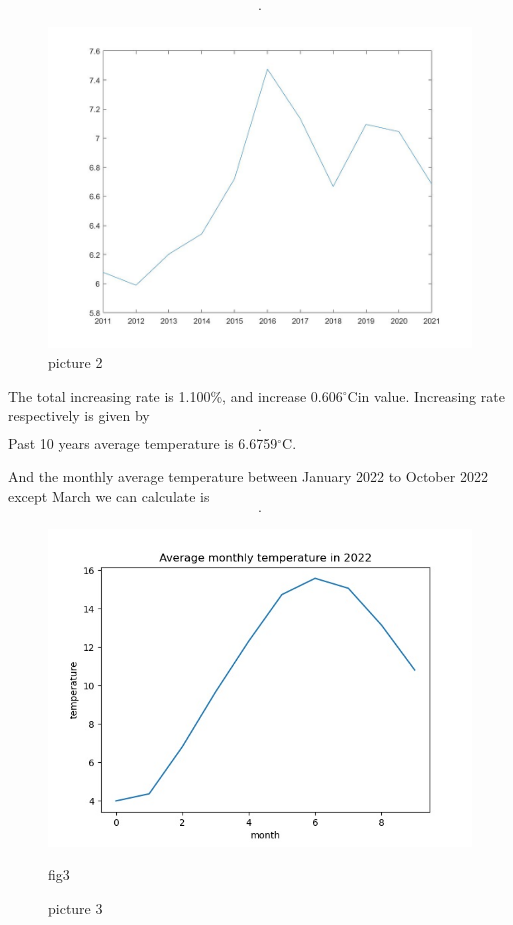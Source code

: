 \documentclass{apmcmthesis}
\def\oc{$^{\circ}$C\;}
\begin{document}
\begin{align*}
  [6.0780,5.9890, 6.2030, 6.3420 , 6.7220 ,7.4750 , 7.1340 , 6.6680 , 7.0950  ,7.0450 ,6.6840].
\end{align*}

\begin{figure}[htbp]
  \centering
  \includegraphics[scale=0.2]{past 10 avg.jpg}
  \caption{picture 2}
\end{figure}

The total increasing rate is 1.100\%, and increase 0.606\oc in value.
Increasing rate respectively is given by
\begin{align*}
  [ -0.0941,-0.0146,0.0357,0.0224,0.0599,0.1120, -0.0456,-0.0653, 0.0640,-0.0070,-0.0512].
\end{align*}
Past 10 years average temperature is 6.6759\oc. 

And the monthly average temperature between January 2022 to October 2022 except March we can calculate is 
\begin{align*}
  [3.989,  4.358, 6.812,9.665, 12.313, 14.742, 15.588, 15.07 ,13.151, 10.811].
\end{align*}
\begin{figure}[htbp]
  \centering
  \includegraphics[scale=0.35]{Average monthly temperature in 2022.jpg}
  \caption{picture 3}{fig3}
\end{figure}
\end{document}
